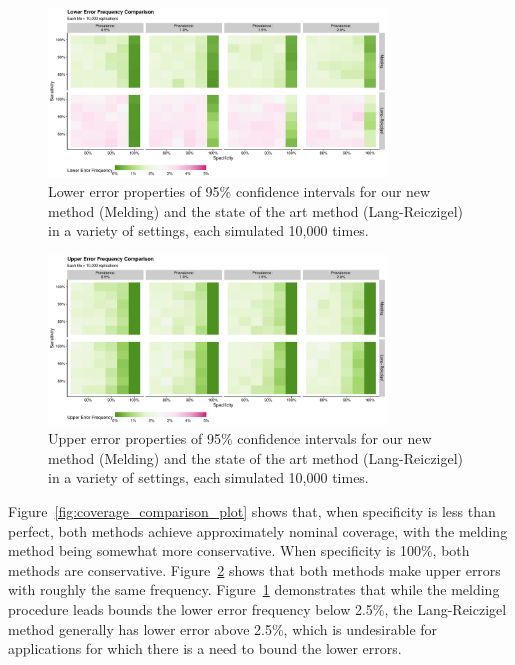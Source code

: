 \documentclass[AMA,STIX1COL]{WileyNJD-v2}
\begin{document}
\begin{figure}
    \centering
    \includegraphics[width=0.8\textwidth]{figures/simple_lower_error_frequency_comparison_plot.pdf}
    \caption{Lower error properties of 95\% confidence intervals for our new method (Melding) and the state of the art method (Lang-Reiczigel) in a variety of settings, each simulated 10,000 times.}
    \label{fig:lower_error_frequency_comparison_plot}
\end{figure}

\begin{figure}
    \centering
    \includegraphics[width=0.8\textwidth]{figures/simple_upper_error_frequency_comparison_plot.pdf}
    \caption{Upper error properties of 95\% confidence intervals for our new method (Melding) and the state of the art method (Lang-Reiczigel) in a variety of settings, each simulated 10,000 times.}
    \label{fig:upper_error_frequency_comparison_plot}
\end{figure}

Figure~\ref{fig:coverage_comparison_plot} shows that, when specificity is less than perfect, both methods achieve approximately nominal coverage, with the melding method being somewhat more conservative.
When specificity is 100\%, both methods are conservative.
Figure~\ref{fig:upper_error_frequency_comparison_plot} shows that both methods make upper errors with roughly the same frequency.
Figure~\ref{fig:lower_error_frequency_comparison_plot} demonstrates that while the melding procedure leads bounds the lower error frequency below 2.5\%, the Lang-Reiczigel method generally has lower error above 2.5\%, which is undesirable for applications for which there is a need to bound the lower errors.
\end{document}

